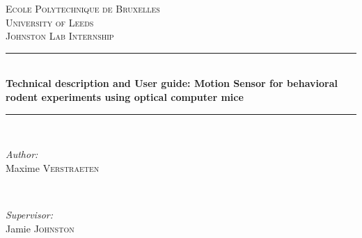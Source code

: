 \documentclass[a4paper]{article}
\begin{document}
\begin{titlepage}

\newcommand{\HRule}{\rule{\linewidth}{0.5mm}} %

\center %
 

\textsc{\LARGE Ecole Polytechnique de Bruxelles}\\[1.5cm] %
\textsc{\LARGE University of Leeds}\\[1.5cm]
\textsc{\large Johnston Lab Internship}\\[0.5cm] %


\HRule \\[0.4cm]
{ \huge \bfseries Technical description and User guide: Motion Sensor for behavioral rodent experiments using optical computer mice}\\[0.4cm] %
\HRule \\[1.5cm]
 

\begin{minipage}{0.4\textwidth}
\begin{flushleft} \large
\emph{Author:}\\
Maxime \textsc{Verstraeten} %
\end{flushleft}
\end{minipage}
~
\begin{minipage}{0.4\textwidth}
\begin{flushright} \large
\emph{Supervisor:} \\
Jamie \textsc{Johnston}\\[0.3cm] %
\end{flushright}
\end{minipage}\\[2cm]


\end{titlepage}
\end{document}
